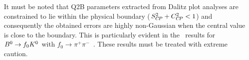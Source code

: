 It must be noted that Q2B parameters extracted from Dalitz plot analyses 
are constrained to lie within the physical boundary ($S_{C\!P}^2 + C_{C\!P}^2 < 1$)
and consequently the obtained errors are highly non-Gaussian when
the central value is close to the boundary.  
This is particularly evident in the \babar\ results for 
$B^0 \to f_0K^0$ with $f_0 \to \pi^+\pi^-$~\cite{Aubert:2009me}.
These results must be treated with extreme caution.

\begin{figure}[htbp]
  \begin{center}
    \hfill
    \resizebox{0.45\textwidth}{!}{
}
\end{center}
\end{figure}
